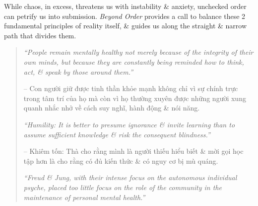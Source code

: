 \documentclass{article}
\begin{document}
\begin{enumerate}
	While chaos, in excess, threatens us with instability \& anxiety, unchecked order can petrify us into submission. {\it Beyond Order} provides a call to balance these 2 fundamental principles of reality itself, \& guides us along the straight \& narrow path that divides them.
	\begin{quotation}
		{\it``People remain mentally healthy not merely because of the integrity of their own minds, but because they are constantly being reminded how to think, act, \& speak by those around them.''}

		-- Con người giữ được tinh thần khỏe mạnh không chỉ vì sự chính trực trong tâm trí của họ mà còn vì họ thường xuyên được những người xung quanh nhắc nhở về cách suy nghĩ, hành động \& nói năng.

		{\it``Humility: It is better to presume ignorance \& invite learning than to assume sufficient knowledge \& risk the consequent blindness.''}

		-- Khiêm tốn: Thà cho rằng mình là người thiếu hiểu biết \& mời gọi học tập hơn là cho rằng có đủ kiến thức \& có nguy cơ bị mù quáng.

		{\it``{\sc Freud} \& {\sc Jung}, with their intense focus on the autonomous individual psyche, placed too little focus on the role of the community in the maintenance of personal mental health.''}


\end{quotation}
\end{enumerate}
\end{document}
